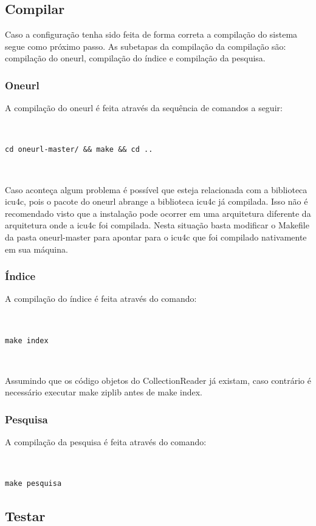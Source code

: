 \documentclass[a4paper]{article}
\begin{document}
\subsection{Compilar}

Caso a configuração tenha sido feita de forma correta a compilação do sistema 
segue como próximo passo. As subetapas da compilação da compilação são: compilação do oneurl, 
compilação do índice e compilação da pesquisa.

\subsubsection{Oneurl}

A compilação do oneurl é feita através da sequência de comandos a seguir:

~

\texttt{cd oneurl-master/ \&\& make \&\& cd ..}

~

Caso aconteça algum problema é possível que esteja relacionada com a biblioteca icu4c, pois 
o pacote do oneurl abrange a biblioteca icu4c já compilada. Isso não é recomendado visto que 
a instalação pode ocorrer em uma arquitetura diferente da arquitetura onde a icu4c foi 
compilada. Nesta situação basta modificar o Makefile da pasta oneurl-master para 
apontar para o icu4c que foi compilado nativamente em sua máquina.

\subsubsection{Índice}

A compilação do índice é feita através do comando: 

~

\texttt{make index}

~

Assumindo que os código objetos do CollectionReader já existam, caso contrário 
é necessário executar make ziplib antes de make index.

\subsubsection{Pesquisa}

A compilação da pesquisa é feita através do comando:

~

\texttt{make pesquisa}

\subsection{Testar}



 
\end{document}
